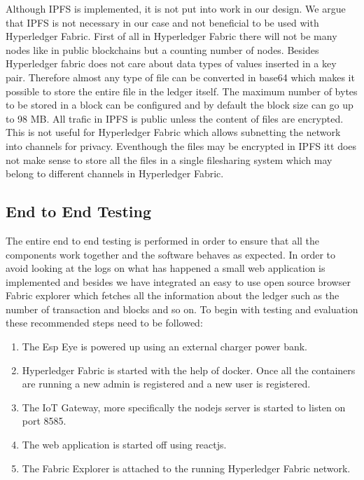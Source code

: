 Although IPFS is implemented, it is not put into work in our design. We argue that IPFS is not necessary in our case and not beneficial to be used with Hyperledger Fabric. First of all in Hyperledger Fabric there will not be many nodes like in public blockchains but a counting number of nodes. Besides Hyperledger fabric does not care about data types of values inserted in a key pair. Therefore almost any type of file can be converted in base64 which makes it possible to store the entire file in the ledger itself. The maximum number of bytes to be stored in a block can be configured and by default the block size can go up to 98 MB. All trafic in IPFS is public unless the content of files are encrypted. This is not useful for Hyperledger Fabric which allows subnetting the network into channels for privacy. Eventhough the files may be encrypted in IPFS itt does not make sense to store all the files in a single filesharing system which may belong to different channels in Hyperledger Fabric. 


\subsection{End to End Testing}

The entire end to end testing is performed in order to ensure that all the components work together and the software behaves as expected. In order to avoid looking at the logs on what has happened a small web application is implemented and besides we have integrated an easy to use open source browser Fabric explorer which fetches all the information about the ledger such as the number of transaction and blocks and so on. 
To begin with testing and evaluation these recommended steps need to be followed: 

\begin{enumerate}
    \item The Esp Eye is powered up using an external charger power bank. 
    \item Hyperledger Fabric is started with the help of docker. Once all the containers are running a new admin is registered and a new user is registered.  
    \item The IoT Gateway, more specifically the nodejs server is started to listen on port 8585. 
    \item The web application is started off using reactjs.
    \item The Fabric Explorer is attached to the running Hyperledger Fabric network. 
\end{enumerate}

